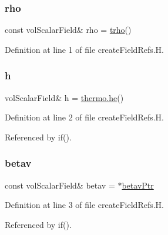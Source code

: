 \subsubsection{\texorpdfstring{rho}{rho}}
{\footnotesize\ttfamily const vol\+Scalar\+Field\& rho = \hyperlink{FMU4FOAM_2application_2solver_2solidFoamAdjustTime_2createFields_8H_a1900a6d4ca2a9f556fdda6733816e355}{trho}()}



Definition at line 1 of file create\+Field\+Refs.\+H.

\mbox{\label{createFieldRefs_8H_a52f2dcc529f3c146980b0ce8dc591698}} 
\subsubsection{\texorpdfstring{h}{h}}
{\footnotesize\ttfamily vol\+Scalar\+Field\& h = \hyperlink{EEqn__1pl_8H_aaacc8fea926e2b83e418a1ad3c1e8c43}{thermo.\+he}()}



Definition at line 2 of file create\+Field\+Refs.\+H.



Referenced by if().

\mbox{\label{createFieldRefs_8H_aebbcdc244775dedabbbc0e1217e45cc0}} 
\subsubsection{\texorpdfstring{betav}{betav}}
{\footnotesize\ttfamily const vol\+Scalar\+Field\& betav = $\ast$\hyperlink{FMU4FOAM_2application_2solver_2solidFoamAdjustTime_2createFields_8H_a844785a2088bf2e5befbb423d1e57112}{betav\+Ptr}}



Definition at line 3 of file create\+Field\+Refs.\+H.



Referenced by if().

